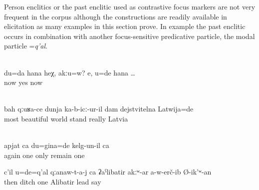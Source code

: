 Person enclitics or the past enclitic used as contrastive focus markers are not very frequent in the corpus although the constructions are readily available in elicitation as many examples in this section prove. In example  the past enclitic occurs in combination with another focus-sensitive predicative particle, the modal particle =\textit{q'al}.
%
\begin{exe}
	\\\label{ex:I am now her, right? Yes, YOU are now}%
	\gll	du=da	hana	heχ,	akːu=w? 	e,	u=de	hana	\ldots\\
			now			yes		now\\
	\glt	{}

	\\\label{ex:It was Latvia that seemed to me to be really the most beautiful country constituents}%
	\gll	bah	qːuʁa-ce	dunja	ka-b-icː-ur-il	dam	dejstvitelna	Latwija=de\\
		most	beautiful	world	stand		really Latvia\\
	\glt	{}

	\\\label{ex:Again it was me who remained alone@26a}%
	\gll	apjat	ca	du=gina=de	kelg-un-il	ca\\
		again	one	only	remain	one\\
	\glt	{}

	\ex	\label{ex:But you were the one who said that they had taken only Alibatir to the ditch@26b}
	\gll	c'il	u=de=q'al	qːanaw-t-a-j	ca	ʡaˁlibatir 	akːʷ-ar		a-w-erč-ib 	Ø-ik'ʷ-an\\
		then		ditch	one	Alibatir 		lead	say\\
	\glt	{} 
\end{exe}

